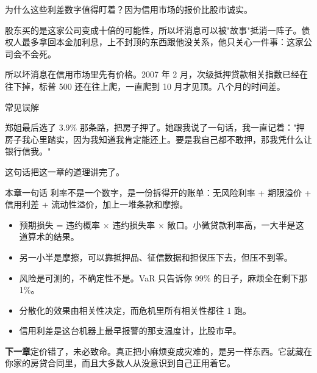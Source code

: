 为什么这些利差数字值得盯着？因为信用市场的报价比股市诚实。

\begin{talkbox}
\end{talkbox}

股东买的是这家公司变成十倍的可能性，所以坏消息可以被"故事"抵消一阵子。债权人最多拿回本金加利息，上不封顶的东西跟他没关系，他只关心一件事：这家公司会不会死。

所以坏消息在信用市场里先有价格。2007 年 2 月，次级抵押贷款相关指数已经在往下掉，标普 500 还在往上爬，一直爬到 10 月才见顶。八个月的时间差。

\begin{mythbox}{常见误解}
\end{mythbox}

\bookbreak

郑姐最后选了 3.9\% 那条路，把房子押了。她跟我说了一句话，我一直记着："押房子我心里踏实，因为我知道我肯定能还上。要是我自己都不敢押，那我凭什么让银行信我。"

这句话把这一章的道理讲完了。

\begin{takeaway}{本章一句话}
利率不是一个数字，是一份拆得开的账单：无风险利率 + 期限溢价 + 信用利差 + 流动性溢价，加上一堆条款和摩擦。

\begin{itemize}
  \item 预期损失 = 违约概率 × 违约损失率 × 敞口。小微贷款利率高，一大半是这道算术的结果。
  \item 另一小半是摩擦，可以靠抵押品、征信数据和担保压下去，但压不到零。
  \item 风险是可测的，不确定性不是。VaR 只告诉你 99\% 的日子，麻烦全在剩下那 1\%。
  \item 分散化的效果由相关性决定，而危机里所有相关性都往 1 跑。
  \item 信用利差是这台机器上最早报警的那支温度计，比股市早。
\end{itemize}

\end{takeaway}

\begin{bridgebox}
\textbf{下一章}定价错了，未必致命。真正把小麻烦变成灾难的，是另一样东西。它就藏在你家的房贷合同里，而且大多数人从没意识到自己正用着它。
\end{bridgebox}

